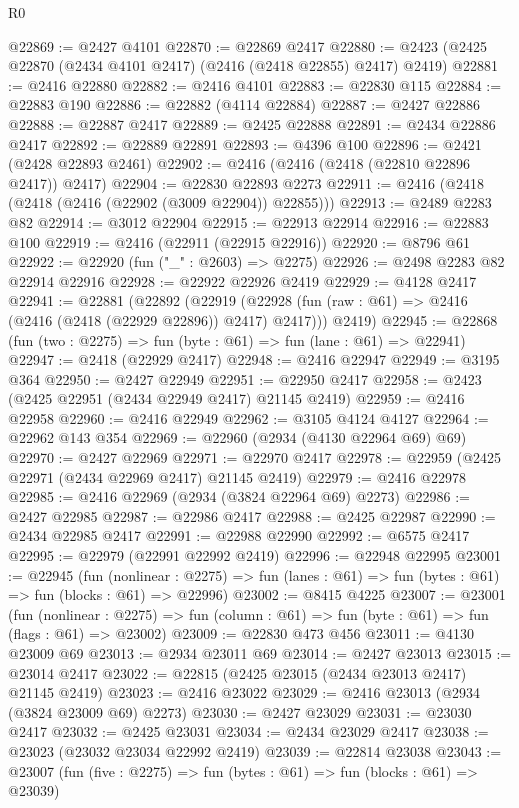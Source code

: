\begin{lexlean}{R0}
\begin{coremodule}
@22869 := @2427 @4101
@22870 := @22869 @2417
@22880 := @2423 (@2425 @22870 (@2434 @4101 @2417) (@2416 (@2418 @22855) @2417) @2419)
@22881 := @2416 @22880
@22882 := @2416 @4101
@22883 := @22830 @115
@22884 := @22883 @190
@22886 := @22882 (@4114 @22884)
@22887 := @2427 @22886
@22888 := @22887 @2417
@22889 := @2425 @22888
@22891 := @2434 @22886 @2417
@22892 := @22889 @22891
@22893 := @4396 @100
@22896 := @2421 (@2428 @22893 @2461)
@22902 := @2416 (@2416 (@2418 (@22810 @22896 @2417)) @2417)
@22904 := @22830 @22893 @2273
@22911 := @2416 (@2418 (@2418 (@2416 (@22902 (@3009 @22904)) @22855)))
@22913 := @2489 @2283 @82
@22914 := @3012 @22904
@22915 := @22913 @22914
@22916 := @22883 @100
@22919 := @2416 (@22911 (@22915 @22916))
@22920 := @8796 @61
@22922 := @22920 (fun ("_" : @2603) => @2275)
@22926 := @2498 @2283 @82 @22914 @22916
@22928 := @22922 @22926 @2419
@22929 := @4128 @2417
@22941 := @22881
    (@22892
      (@22919 (@22928 (fun (raw : @61) => @2416 (@2416 (@2418 (@22929 @22896)) @2417) @2417)))
      @2419)
@22945 := @22868 (fun (two : @2275) => fun (byte : @61) => fun (lane : @61) => @22941)
@22947 := @2418 (@22929 @2417)
@22948 := @2416 @22947
@22949 := @3195 @364
@22950 := @2427 @22949
@22951 := @22950 @2417
@22958 := @2423 (@2425 @22951 (@2434 @22949 @2417) @21145 @2419)
@22959 := @2416 @22958
@22960 := @2416 @22949
@22962 := @3105 @4124 @4127
@22964 := @22962 @143 @354
@22969 := @22960 (@2934 (@4130 @22964 @69) @69)
@22970 := @2427 @22969
@22971 := @22970 @2417
@22978 := @22959 (@2425 @22971 (@2434 @22969 @2417) @21145 @2419)
@22979 := @2416 @22978
@22985 := @2416 @22969 (@2934 (@3824 @22964 @69) @2273)
@22986 := @2427 @22985
@22987 := @22986 @2417
@22988 := @2425 @22987
@22990 := @2434 @22985 @2417
@22991 := @22988 @22990
@22992 := @6575 @2417
@22995 := @22979 (@22991 @22992 @2419)
@22996 := @22948 @22995
@23001 := @22945
    (fun (nonlinear : @2275) =>
    fun (lanes : @61) => fun (bytes : @61) => fun (blocks : @61) => @22996)
@23002 := @8415 @4225
@23007 := @23001
    (fun (nonlinear : @2275) =>
    fun (column : @61) => fun (byte : @61) => fun (flags : @61) => @23002)
@23009 := @22830 @473 @456
@23011 := @4130 @23009 @69
@23013 := @2934 @23011 @69
@23014 := @2427 @23013
@23015 := @23014 @2417
@23022 := @22815 (@2425 @23015 (@2434 @23013 @2417) @21145 @2419)
@23023 := @2416 @23022
@23029 := @2416 @23013 (@2934 (@3824 @23009 @69) @2273)
@23030 := @2427 @23029
@23031 := @23030 @2417
@23032 := @2425 @23031
@23034 := @2434 @23029 @2417
@23038 := @23023 (@23032 @23034 @22992 @2419)
@23039 := @22814 @23038
@23043 := @23007 (fun (five : @2275) => fun (bytes : @61) => fun (blocks : @61) => @23039)

\end{coremodule}
\end{lexlean}
